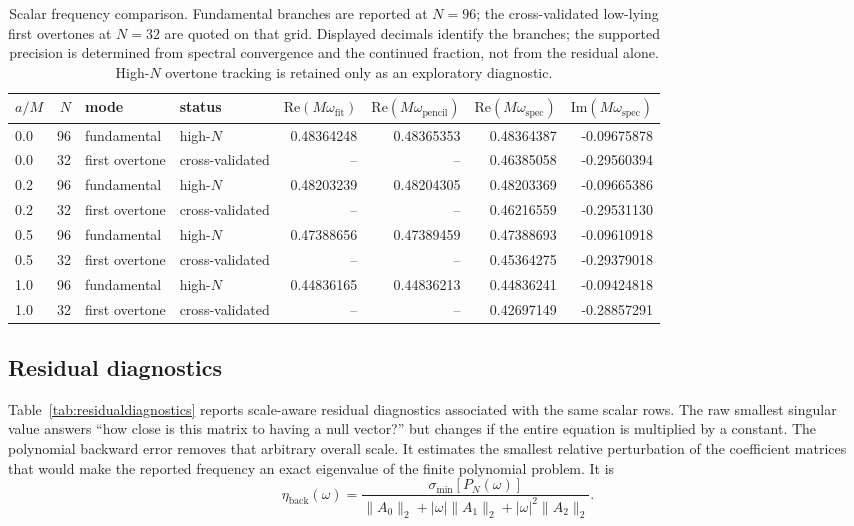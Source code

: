 \documentclass[12pt,a4paper]{article}
\begin{document}
\begin{table}[H]
\centering
\footnotesize
\renewcommand{\arraystretch}{1.16}
\begin{tabular}{lrllrrrr}
\toprule
\(a/M\) & \(N\) & mode & status &
\(\mathrm{Re}(M\omega_{\mathrm{fit}})\) &
\(\mathrm{Re}(M\omega_{\mathrm{pencil}})\) &
\(\mathrm{Re}(M\omega_{\mathrm{spec}})\) &
\(\mathrm{Im}(M\omega_{\mathrm{spec}})\)\\
\midrule
0.0 & 96 & fundamental & high-\(N\) & 0.48364248 & 0.48365353 & 0.48364387 & -0.09675878\\
0.0 & 32 & first overtone & cross-validated & -- & -- & 0.46385058 & -0.29560394\\
0.2 & 96 & fundamental & high-\(N\) & 0.48203239 & 0.48204305 & 0.48203369 & -0.09665386\\
0.2 & 32 & first overtone & cross-validated & -- & -- & 0.46216559 & -0.29531130\\
0.5 & 96 & fundamental & high-\(N\) & 0.47388656 & 0.47389459 & 0.47388693 & -0.09610918\\
0.5 & 32 & first overtone & cross-validated & -- & -- & 0.45364275 & -0.29379018\\
1.0 & 96 & fundamental & high-\(N\) & 0.44836165 & 0.44836213 & 0.44836241 & -0.09424818\\
1.0 & 32 & first overtone & cross-validated & -- & -- & 0.42697149 & -0.28857291\\
\bottomrule
\end{tabular}
\caption{Scalar frequency comparison. Fundamental branches are reported at
\(N=96\); the cross-validated low-lying first overtones at \(N=32\) are quoted
on that grid. Displayed decimals identify the branches; the supported precision
is determined from spectral convergence and the continued fraction, not from
the residual alone. High-\(N\) overtone tracking is retained only as an
exploratory diagnostic.}
\label{tab:spectralresults}
\end{table}

\subsection{Residual diagnostics}

Table~\ref{tab:residualdiagnostics} reports scale-aware residual diagnostics
associated with the same scalar rows.  The raw smallest singular value answers
``how close is this matrix to having a null vector?'' but changes if the entire
equation is multiplied by a constant.  The polynomial backward error removes
that arbitrary overall scale.  It estimates the smallest relative perturbation
of the coefficient matrices that would make the reported frequency an exact
eigenvalue of the finite polynomial problem.  It is
\begin{equation}
\eta_{\mathrm{back}}(\omega)=
\frac{\sigma_{\min}[P_N(\omega)]}
{\lVert A_0\rVert_2+|\omega|\lVert A_1\rVert_2+|\omega|^2\lVert A_2\rVert_2}.
\label{eq:backwarderror}
\end{equation}
\end{document}
